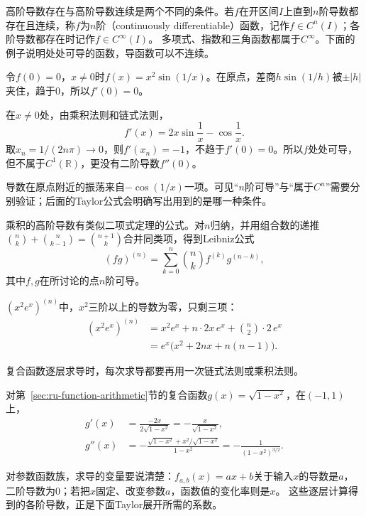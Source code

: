 高阶导数存在与高阶导数连续是两个不同的条件。若$f$在开区间$I$上直到$n$阶导数都存在且连续，称$f$为$n$阶（continuously differentiable）函数，记作$f\in C^n(I)$；各阶导数都存在时记作$f\in C^\infty(I)$。
多项式、指数和三角函数都属于$C^\infty$。下面的例子说明处处可导的函数，导函数可以不连续。
\begin{example}[处处可导而导函数不连续]
\label{ex:analysis-derivative-not-continuous}
令$f(0)=0$，$x\neq0$时$f(x)=x^2\sin(1/x)$。在原点，差商$h\sin(1/h)$被$\pm|h|$夹住，趋于$0$，所以$f'(0)=0$。

在$x\neq0$处，由乘积法则和链式法则，
\[
 f'(x)=2x\sin\frac1x-\cos\frac1x.
\]
取$x_n=1/(2n\pi)\to0$，则$f'(x_n)=-1$，不趋于$f'(0)=0$。所以$f$处处可导，但不属于$C^1(\mathbb R)$，更没有二阶导数$f''(0)$。
\end{example}
导数在原点附近的振荡来自$-\cos(1/x)$一项。可见“$n$阶可导”与“属于$C^n$”需要分别验证；后面的Taylor公式会明确写出用到的是哪一种条件。

乘积的高阶导数有类似二项式定理的公式。对$n$归纳，并用组合数的递推$\binom nk+\binom n{k-1}=\binom{n+1}k$合并同类项，得到Leibniz公式
\begin{equation}
 (fg)^{(n)}=\sum_{k=0}^n\binom nkf^{(k)}g^{(n-k)},
 \label{eq:ru-leibniz}
\end{equation}
其中$f,g$在所讨论的点$n$阶可导。
\begin{example}[用Leibniz公式求$(x^2e^x)^{(n)}$]
\label{ex:ru-leibniz-x2-exp}
$(x^2e^x)^{(n)}$中，$x^2$三阶以上的导数为零，只剩三项：
\[
 \begin{aligned}
 (x^2e^x)^{(n)}&=x^2e^x+n\cdot2x\,e^x+\binom n2\cdot2\,e^x\\
 &=e^x\bigl(x^2+2nx+n(n-1)\bigr).
 \end{aligned}
\]
\end{example}

复合函数逐层求导时，每次求导都要再用一次链式法则或乘积法则。
\begin{example}
\label{ex:ru-sqrt-second-derivative}
对第~\ref{sec:ru-function-arithmetic}节的复合函数$g(x)=\sqrt{1-x^2}$，在$(-1,1)$上，
\begin{align*}
 g'(x)&=\frac{-2x}{2\sqrt{1-x^2}}=-\frac x{\sqrt{1-x^2}},\\
 g''(x)&=-\frac{\sqrt{1-x^2}+x^2/\sqrt{1-x^2}}{1-x^2}=-\frac1{(1-x^2)^{3/2}}.
\end{align*}
\end{example}
对参数函数族，求导的变量要说清楚：$f_{a,b}(x)=ax+b$关于输入$x$的导数是$a$，二阶导数为$0$；若把$x$固定、改变参数$a$，函数值的变化率则是$x$。
这些逐层计算得到的各阶导数，正是下面Taylor展开所需的系数。
